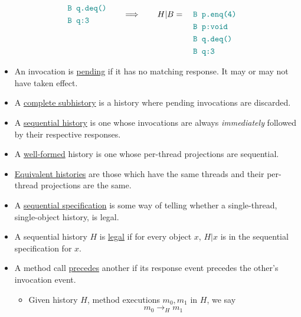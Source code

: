 \documentclass[twocolumn,landscape,10pt]{article}
\theoremstyle{definition}
\begin{document}
\begin{itemize}
\[\begin{align}
                &\textcolor{teal}{\texttt{B q.deq()}} \\
                &\textcolor{teal}{\texttt{B q:3}} \\
            \end{align} 
            \qquad\Longrightarrow\qquad
            H|B = \quad\begin{align}
                \\
                \\
                \\
                &\textcolor{teal}{\texttt{B p.enq(4)}} \\
                &\textcolor{teal}{\texttt{B p:void}} \\
                &\textcolor{teal}{\texttt{B q.deq()}} \\
                &\textcolor{teal}{\texttt{B q:3}} \\
            \end{align} 
        \]
    \item An invocation is \underline{pending} if it has no matching response.
        It may or may not have taken effect.
    \item A \underline{complete subhistory} is a history where pending
        invocations are discarded.
    \item A \underline{sequential history} is one whose invocations are always
        \emph{immediately} followed by their respective responses.
    \item A \underline{well-formed} history is one whose per-thread projections 
        are sequential.
    \item \underline{Equivalent histories} are those which have the same
        threads and their per-thread projections are the same.
    \item A \underline{sequential specification} is some way of telling whether
        a single-thread, single-object history, is legal.
    \item A sequential history $H$ is \underline{legal} if for every object $x$,
        $H|x$ is in the sequential specification for $x$.
    \item A method call \underline{precedes} another if its response event 
        precedes the other's invocation event.
        \begin{itemize}
            \item Given history $H$, method executions $m_0, m_1$ in $H$,
                we say
                \[
                    m_0 \rightarrow_H m_1
\]
\end{itemize}
\end{itemize}
\end{document}

